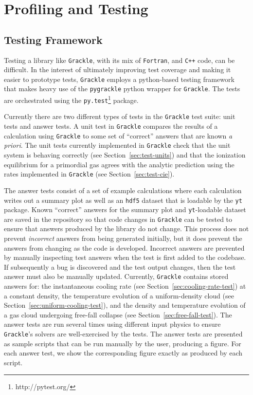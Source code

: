 \section{Profiling and Testing}
\label{sec:profiling-and-testing}



\subsection{Testing Framework}
\label{sec:testing}

Testing a library like \texttt{Grackle}, with its mix of \texttt{Fortran}, and
\texttt{C++} code, can be difficult. In the interest of ultimately improving
test coverage and making it easier to prototype tests, \texttt{Grackle} employs a
python-based testing framework that makes heavy use of the \texttt{pygrackle}
python wrapper for \texttt{Grackle}. The tests are orchestrated using the
\texttt{py.test}\footnote{http://pytest.org/} package.

Currently there are two different types of tests in the \texttt{Grackle} test suite: unit
tests and answer tests. A unit test in \texttt{Grackle} compares the results of a
calculation using \texttt{Grackle} to some set of ``correct'' answers that are known
\textit{a priori}. The unit tests currently implemented in \texttt{Grackle} check that the
unit system is behaving correctly (see Section~\ref{sec:test-units}) and that the
ionization equilibrium for a primordial gas agrees with the analytic prediction
using the rates implemented in \texttt{Grackle} (see Section~\ref{sec:test-cie}).

The answer tests consist of a set of example calculations where each calculation
writes out a summary plot as well as an \texttt{hdf5} dataset that is loadable
by the \texttt{yt} package. Known ``correct'' answers for the summary plot and
\texttt{yt}-loadable dataset are saved in the repository so that code changes in
\texttt{Grackle} can be tested to ensure that answers produced by the library do not
change. This process does not prevent \textit{incorrect} answers from being
generated initially, but it does prevent the answers from changing as the code
is developed. Incorrect answers are prevented by manually inspecting test
answers when the test is first added to the codebase. If subsequently a bug is
discovered and the test output changes, then the test answer must also be
manually updated. Currently, \texttt{Grackle} contains stored answers for: the
instantaneous cooling rate (see Section~\ref{sec:cooling-rate-test})
at a constant density, the temperature evolution of a uniform-density cloud (see
Section~\ref{sec:uniform-cooling-test}), and the density and
temperature evolution of a gas cloud undergoing free-fall collapse
(see Section~\ref{sec:free-fall-test}). The answer tests are run
several times using different input physics to ensure \texttt{Grackle}'s
solvers are well-exercised by the tests.  The answer tests are
presented as sample scripts that can be run manually by the user,
producing a figure.  For each answer test, we show the corresponding
figure exactly as produced by each script.

